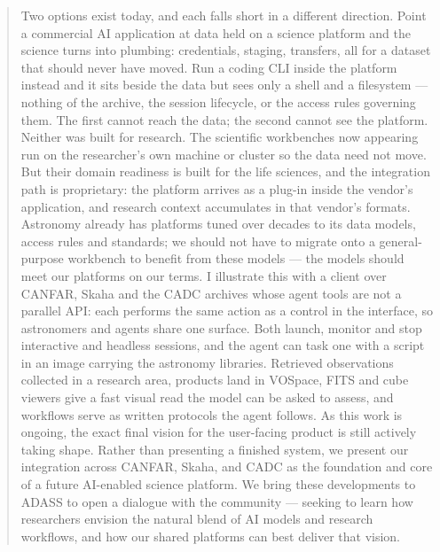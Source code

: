 \documentclass[11pt,twoside]{article}
\begin{document}
\begin{abstract}
Two options exist today, and each falls short in a different direction. Point a commercial AI application at data held on a science platform and the science turns into plumbing: credentials, staging, transfers, all for a dataset that should never have moved. Run a coding CLI inside the platform instead and it sits beside the data but sees only a shell and a filesystem --- nothing of the archive, the session lifecycle, or the access rules governing them. The first cannot reach the data; the second cannot see the platform. Neither was built for research.
The scientific workbenches now appearing run on the researcher's own machine or cluster so the data need not move. But their domain readiness is built for the life sciences, and the integration path is proprietary: the platform arrives as a plug-in inside the vendor's application, and research context accumulates in that vendor's formats. Astronomy already has platforms tuned over decades to its data models, access rules and standards; we should not have to migrate onto a general-purpose workbench to benefit from these models --- the models should meet our platforms on our terms.
I illustrate this with a client over CANFAR, Skaha and the CADC archives whose agent tools are not a parallel API: each performs the same action as a control in the interface, so astronomers and agents share one surface. Both launch, monitor and stop interactive and headless sessions, and the agent can task one with a script in an image carrying the astronomy libraries. Retrieved observations collected in a research area, products land in VOSpace, FITS and cube viewers give a fast visual read the model can be asked to assess, and workflows serve as written protocols the agent follows.
As this work is ongoing, the exact final vision for the user-facing product is still actively taking shape. Rather than presenting a finished system, we present our integration across CANFAR, Skaha, and CADC as the foundation and core of a future AI-enabled science platform. We bring these developments to ADASS to open a dialogue with the community --- seeking to learn how researchers envision the natural blend of AI models and research workflows, and how our shared platforms can best deliver that vision.
\end{abstract}

\end{document}
